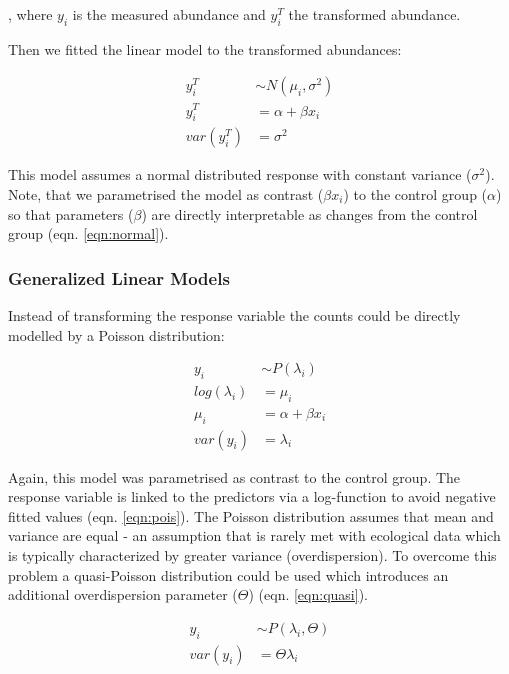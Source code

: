 \documentclass{scrartcl}
\begin{document}
, where $y_i$ is the measured abundance and $y_i^T$ the transformed abundance. 

Then we fitted the linear model to the transformed abundances:

\begin{align}
  y_i^T &\sim N(\mu_i, \sigma^2) \nonumber \\
  y_i^T &= \alpha + \beta x_i \label{eqn:normal} \\
  var(y_i^T) &= \sigma^2 \nonumber
\end{align}

This model assumes a normal distributed response with constant variance ($\sigma^2$).
Note, that we parametrised the model as contrast ($\beta x_i$) to the control group ($\alpha$) so that parameters ($\beta$) are directly interpretable as changes from the control group (eqn. \ref{eqn:normal}).


\subsubsection{Generalized Linear Models}
Instead of transforming the response variable the counts could be directly modelled by a Poisson distribution:

\begin{align}
  y_i &\sim P(\lambda_i) \nonumber \\
  log(\lambda_i) &= \mu_i \label{eqn:pois} \\
  \mu_i &= \alpha + \beta x_i \nonumber \\
  var(y_i) &= \lambda_i \nonumber
\end{align}

Again, this model was parametrised as contrast to the control group. 
The response variable is linked to the predictors via a log-function to avoid negative fitted values (eqn. \ref{eqn:pois}). 
The Poisson distribution assumes that mean and variance are equal - an assumption that is rarely met with ecological data which is typically characterized by greater variance (overdispersion).
To overcome this problem a quasi-Poisson distribution could be used which introduces an additional overdispersion parameter ($\Theta$) (eqn. \ref{eqn:quasi}).

\begin{align}
  y_i &\sim P(\lambda_i, \Theta) \label{eqn:quasi} \\
  var(y_i) &= \Theta \lambda_i  \nonumber
\end{align}
\end{document}
